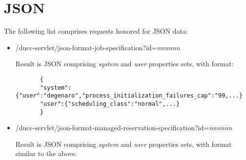 % 
% 
% 
% 

    \section{JSON}
    \label{sec:ws.JSON}
    
    The following list comprises requests honored for JSON data:
    
    \begin{itemize}
       \item /ducc-servlet/json-format-job-specification?id={\em nnnnnn}
       
       Result is JSON comprising {\em system} and {\em user} properties sets, with format: 
       \begin{verbatim}
       {
       "system":{"user":"degenaro","process_initialization_failures_cap":"99,...}
       "user":{"scheduling_class":"normal",...}
       }
	   \end{verbatim}
		
       \item /ducc-servlet/json-format-managed-reservation-specification?id={\em nnnnnn}
       
       Result is JSON comprising {\em system} and {\em user} properties sets, with format similar
       to  the above.
       
    \end{itemize}

